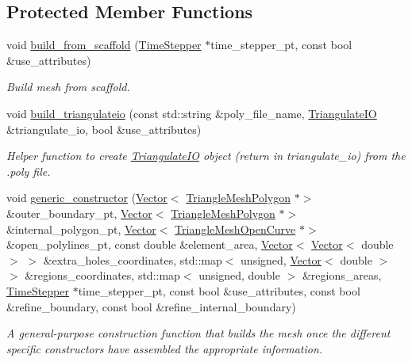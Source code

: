 \subsection*{Protected Member Functions}
\begin{DoxyCompactItemize}
\item 
void \hyperlink{classoomph_1_1TriangleMesh_a82ccf74f4e2befe3a6acd458d4e37c35}{build\+\_\+from\+\_\+scaffold} (\hyperlink{classoomph_1_1TimeStepper}{Time\+Stepper} $\ast$time\+\_\+stepper\+\_\+pt, const bool \&use\+\_\+attributes)
\begin{DoxyCompactList}\small\item\em Build mesh from scaffold. \end{DoxyCompactList}\item 
void \hyperlink{classoomph_1_1TriangleMesh_a1b18773cfdc79964dc7ae58dd11c2862}{build\+\_\+triangulateio} (const std\+::string \&poly\+\_\+file\+\_\+name, \hyperlink{structoomph_1_1TriangulateIO}{Triangulate\+IO} \&triangulate\+\_\+io, bool \&use\+\_\+attributes)
\begin{DoxyCompactList}\small\item\em Helper function to create \hyperlink{structoomph_1_1TriangulateIO}{Triangulate\+IO} object (return in triangulate\+\_\+io) from the .poly file. \end{DoxyCompactList}\item 
void \hyperlink{classoomph_1_1TriangleMesh_a2cdd830462582e6e004dee54ce8f1e2c}{generic\+\_\+constructor} (\hyperlink{classoomph_1_1Vector}{Vector}$<$ \hyperlink{classoomph_1_1TriangleMeshPolygon}{Triangle\+Mesh\+Polygon} $\ast$$>$ \&outer\+\_\+boundary\+\_\+pt, \hyperlink{classoomph_1_1Vector}{Vector}$<$ \hyperlink{classoomph_1_1TriangleMeshPolygon}{Triangle\+Mesh\+Polygon} $\ast$$>$ \&internal\+\_\+polygon\+\_\+pt, \hyperlink{classoomph_1_1Vector}{Vector}$<$ \hyperlink{classoomph_1_1TriangleMeshOpenCurve}{Triangle\+Mesh\+Open\+Curve} $\ast$$>$ \&open\+\_\+polylines\+\_\+pt, const double \&element\+\_\+area, \hyperlink{classoomph_1_1Vector}{Vector}$<$ \hyperlink{classoomph_1_1Vector}{Vector}$<$ double $>$ $>$ \&extra\+\_\+holes\+\_\+coordinates, std\+::map$<$ unsigned, \hyperlink{classoomph_1_1Vector}{Vector}$<$ double $>$ $>$ \&regions\+\_\+coordinates, std\+::map$<$ unsigned, double $>$ \&regions\+\_\+areas, \hyperlink{classoomph_1_1TimeStepper}{Time\+Stepper} $\ast$time\+\_\+stepper\+\_\+pt, const bool \&use\+\_\+attributes, const bool \&refine\+\_\+boundary, const bool \&refine\+\_\+internal\+\_\+boundary)
\begin{DoxyCompactList}\small\item\em A general-\/purpose construction function that builds the mesh once the different specific constructors have assembled the appropriate information. \end{DoxyCompactList}\item 
$$
\end{DoxyCompactItemize}
